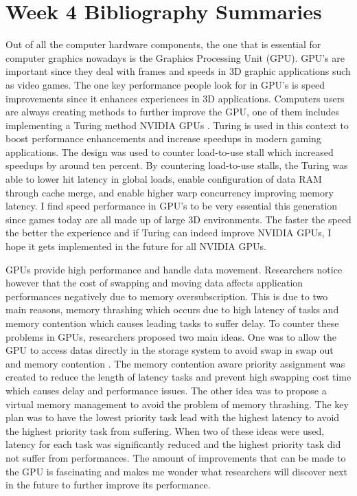 \documentclass{article}
\begin{document}
\section{Week 4 Bibliography Summaries}

Out of all the computer hardware components, the one that is essential for computer graphics nowadays is the Graphics Processing Unit (GPU). GPU’s are important since they deal with frames and speeds in 3D graphic applications such as video games. The one key performance people look for in GPU’s is speed improvements since it enhances experiences in 3D applications. Computers users are always creating methods to further improve the GPU, one of them includes implementing a Turing method NVIDIA GPUs \cite{9151311}. Turing is used in this context to  boost performance enhancements and increase speedups in modern gaming applications. The design was used to counter load-to-use stall which increased speedups by around ten percent. By countering load-to-use stalls, the Turing was able to lower hit latency in global loads, enable configuration of data RAM through cache merge, and enable higher warp concurrency improving memory latency. I find speed performance in GPU’s to be very essential this generation since games today are all made up of large 3D environments. The faster the speed the better the experience and if Turing can indeed improve NVIDIA GPUs, I hope it gets implemented in the future for all NVIDIA GPUs.

GPUs provide high performance and handle data movement. Researchers notice however that the cost of swapping and moving data affects application performances negatively due to memory oversubscription. This is due to two main reasons, memory thrashing which occurs due to high latency of tasks and memory contention which causes leading tasks to suffer delay. To counter these problems in GPUs, researchers proposed two main ideas. One was to allow the GPU to access datas directly in the storage system to avoid swap in swap out and memory contention \cite{10.1145/3341105.3373866}. The memory contention aware priority assignment was created to reduce the length of latency tasks and prevent high swapping cost time which causes delay and performance issues. The other idea was to propose a virtual memory management to avoid the problem of memory thrashing. The key plan was to have the lowest priority task lead with the highest latency to avoid the highest priority task from suffering. When two of these ideas were used, latency for each task was significantly reduced and the highest priority task did not suffer from performances. The amount of improvements that can be made to the GPU is fascinating and makes me wonder what researchers will discover next in the future to further improve its performance. 



\end{document}
